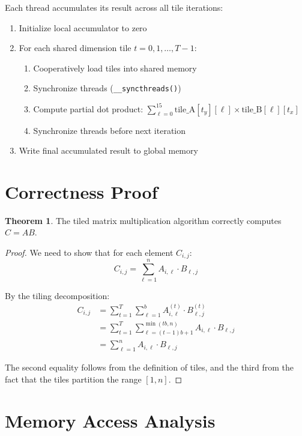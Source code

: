\documentclass{amsbook}
\theoremstyle{definition}
\newtheorem{theorem}{Theorem}[chapter]
\begin{document}
Each thread accumulates its result across all tile iterations:
\begin{enumerate}
\item Initialize local accumulator to zero
\item For each shared dimension tile $t = 0, 1, \ldots, T-1$:
\begin{enumerate}
    \item Cooperatively load tiles into shared memory
    \item Synchronize threads (\texttt{\_\_syncthreads()})
    \item Compute partial dot product: $\sum_{\ell=0}^{15} \text{tile\_A}[t_y][\ell] \times \text{tile\_B}[\ell][t_x]$
    \item Synchronize threads before next iteration
\end{enumerate}
\item Write final accumulated result to global memory
\end{enumerate}

\section{Correctness Proof}

\begin{theorem}
The tiled matrix multiplication algorithm correctly computes $C = AB$.
\end{theorem}

\begin{proof}
We need to show that for each element $C_{i,j}$:
\begin{equation}
C_{i,j} = \sum_{\ell=1}^{n} A_{i,\ell} \cdot B_{\ell,j}
\end{equation}

By the tiling decomposition:
\begin{align}
C_{i,j} &= \sum_{t=1}^{T} \sum_{\ell=1}^{b} A^{(t)}_{i,\ell} \cdot B^{(t)}_{\ell,j} \\
&= \sum_{t=1}^{T} \sum_{\ell=(t-1)b+1}^{\min(tb,n)} A_{i,\ell} \cdot B_{\ell,j} \\
&= \sum_{\ell=1}^{n} A_{i,\ell} \cdot B_{\ell,j}
\end{align}

The second equality follows from the definition of tiles, and the third from the fact that the tiles partition the range $[1,n]$.
\end{proof}

\section{Memory Access Analysis}
\end{document}

